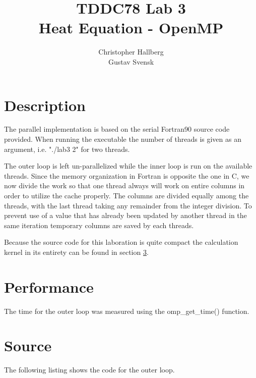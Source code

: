 \documentclass[a4paper, 12pt]{article}
\begin{document}
\title{TDDC78 Lab 3\\
        Heat Equation - OpenMP}
\author{Christopher Hallberg \\
        Gustav Svensk}
\maketitle

\thispagestyle{empty}

\newpage
\setcounter{page}{1}
\tableofcontents
\newpage

\section{Description}
The parallel implementation is based on the serial Fortran90 source code
provided. When running the executable the number of threads is given as
an argument, i.e. "./lab3 2" for two threads.

The outer loop is left un-parallelized while the inner loop is run on the
available threads. Since the memory organization in Fortran is opposite the one
in C, we now divide the work so that one thread always will work on entire
columns in order to utilize the cache properly. The columns are divided equally
among the threads, with the last thread taking any remainder from the integer
division. To prevent use of a value that has already been updated by another
thread in the same iteration temporary columns are saved by each threads.

Because the source code for this laboration is quite compact the
calculation kernel in its entirety can be found in section \ref{sec:src}.

\section{Performance}
The time for the outer loop was measured using the omp\_get\_time() function.

\newpage
\section{Source}
\label{sec:src}
The following listing shows the code for the outer loop.
\end{document}
